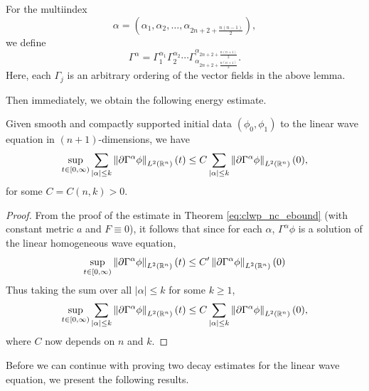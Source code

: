 \documentclass{article}
\begin{document}
\begin{definition}
	For the multiindex 
	\begin{equation*}
		\alpha = \left(\alpha_{1}, \alpha_{2}, \ldots, \alpha_{2n + 2 + \frac{n(n-1)}{2}}\right), 
	\end{equation*}
	we define 
	\begin{equation*}
		\Gamma^{\alpha} = \Gamma_{1}^{\alpha_{1}}\Gamma_{2}^{\alpha_{2}}\dotsm {\Gamma}^{\alpha_{2n + 2 + \frac{n(n + 1)}{2}}}_{\alpha_{2n + 2 + \frac{n(n + 1)}{2}}}. 
	\end{equation*}
	Here, each $\Gamma_{j}$ is an arbitrary ordering of the vector fields in the above lemma. 
\end{definition}
Then immediately, we obtain the following energy estimate. 
\begin{corollary}
	Given smooth and compactly supported initial data $(\phi_{0}, \phi_{1})$ to the linear wave equation in $(n + 1)$-dimensions, we have 
	\begin{equation*}
		\sup_{t \in[0,\infty)}\sum_{|\alpha|\leq k}\left\Vert \partial \Gamma^{\alpha}\phi \right\Vert_{L^{2}(\mathbb{R}^{n})}(t) \leq C \sum_{|\alpha|\leq k}\left\Vert \partial \Gamma^{\alpha}\phi \right\Vert_{L^{2}(\mathbb{R}^{n})}(0),
	\end{equation*} 
	for some $C = C(n,k) > 0$. 
\end{corollary}  
\begin{proof}
	From the proof of the estimate in Theorem \ref{eq:clwp_nc_ebound} (with constant metric $a$ and $F \equiv 0$), it follows that since for each $\alpha$,  $\Gamma^{\alpha}\phi$ is a solution of the linear homogeneous wave equation, 
	\begin{equation*}
		\sup_{t \in [0,\infty)}\left\Vert \partial \Gamma^{\alpha}\phi \right\Vert_{L^{2}(\mathbb{R}^{n})}(t) \leq C'\left\Vert \partial \Gamma^{\alpha}\phi \right\Vert_{L^{2}(\mathbb{R}^{n})}(0) 
	\end{equation*} 
	Thus taking the sum over all $|\alpha| \leq k$ for some $k \geq 1$, 
	\begin{equation*}
		\sup_{t \in [0,\infty)}\sum_{|\alpha|\leq k}\left\Vert \partial \Gamma^{\alpha}\phi \right\Vert_{L^{2}(\mathbb{R}^{n})}(t) \leq C \sum_{|\alpha|\leq k}\left\Vert \partial \Gamma^{\alpha}\phi \right\Vert_{L^{2}(\mathbb{R}^{n})}(0), 
	\end{equation*} 
	where $C$ now depends on $n$ and $k$. 
\end{proof} 
Before we can continue with proving two decay estimates for the linear wave equation, we present the following results. 
\end{document}

